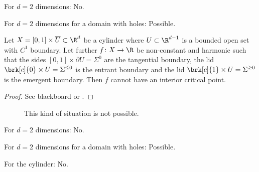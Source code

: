 \begin{frame}

  {\questionFlowthrough
  \begin{answer}
    \begin{itemize}
      \item For $d=2$ dimensions: No. 
        {\item For $d=2$ dimensions for a domain with holes: Possible.}
    \end{itemize}
  \end{answer}}
\end{frame}

\begin{frame}
  \begin{proposition}\label{pr:n3_inflowOutflowCylinder}
    Let $X=[0,1]\times \overline{U}\subset\R^d$ be a cylinder where $U\subset\R^{d-1}$ is a bounded open set with $C^1$ boundary.
    Let further $f\colon X\to\R$ be non-constant and
    harmonic such that the sides
    $[0,1]\times \partial U=\Sigma^0$ are the tangential boundary,
    the lid $\brk[c]{0}\times U=\Sigma^{\leq0}$ is the entrant boundary and
    the lid $\brk[c]{1}\times U=\Sigma^{\geq0}$ is the emergent boundary. 
    Then $f$ cannot have an interior critical point.
  \end{proposition}
  \begin{proof}
    See blackboard or \autocite{Koppenhoefer2024}.
  \end{proof}
\end{frame}

\begin{frame}
  \begin{figure}
    \centering
    
    \caption{This kind of situation is not possible.}
    \label{fi:n3_cylinder}
  \end{figure}
\end{frame}

\begin{frame}

  {\questionFlowthrough
  \begin{answer}
    \begin{itemize}
      \item For $d=2$ dimensions: No.
      \item For $d=2$ dimensions for a domain with holes: Possible.
        {\item For the cylinder: No.}
    \end{itemize}
  \end{answer}}
\end{frame}

